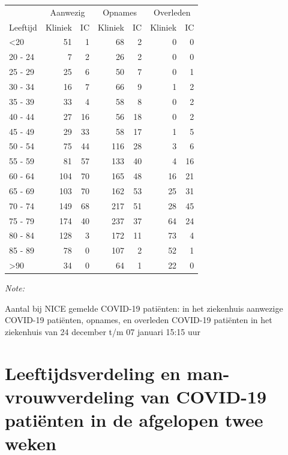 \documentclass[
  english,
  man,floatsintext]{apa6}
\begin{document}
\begin{table}
\centering\begingroup\fontsize{10}{12}\selectfont

\begin{threeparttable}
\begin{tabular}{lrrrrrr}
\toprule
\multicolumn{1}{c}{ } & \multicolumn{2}{c}{Aanwezig} & \multicolumn{2}{c}{Opnames} & \multicolumn{2}{c}{Overleden} \\
\cmidrule(l{3pt}r{3pt}){2-3} \cmidrule(l{3pt}r{3pt}){4-5} \cmidrule(l{3pt}r{3pt}){6-7}
Leeftijd & Kliniek & IC & Kliniek & IC & Kliniek & IC\\
\midrule
<20 & 51 & 1 & 68 & 2 & 0 & 0\\
20 - 24 & 7 & 2 & 26 & 2 & 0 & 0\\
25 - 29 & 25 & 6 & 50 & 7 & 0 & 1\\
30 - 34 & 16 & 7 & 66 & 9 & 1 & 2\\
35 - 39 & 33 & 4 & 58 & 8 & 0 & 2\\
40 - 44 & 27 & 16 & 56 & 18 & 0 & 2\\
45 - 49 & 29 & 33 & 58 & 17 & 1 & 5\\
50 - 54 & 75 & 44 & 116 & 28 & 3 & 6\\
55 - 59 & 81 & 57 & 133 & 40 & 4 & 16\\
60 - 64 & 104 & 70 & 165 & 48 & 16 & 21\\
65 - 69 & 103 & 70 & 162 & 53 & 25 & 31\\
70 - 74 & 149 & 68 & 217 & 51 & 28 & 45\\
75 - 79 & 174 & 40 & 237 & 37 & 64 & 24\\
80 - 84 & 128 & 3 & 172 & 11 & 73 & 4\\
85 - 89 & 78 & 0 & 107 & 2 & 52 & 1\\
>90 & 34 & 0 & 64 & 1 & 22 & 0\\
\bottomrule
\end{tabular}
\begin{tablenotes}
\item \textit{Note: } 
\item Aantal bij NICE gemelde COVID-19 patiënten: in het ziekenhuis aanwezige COVID-19 patiënten, opnames, en overleden COVID-19 patiënten in het ziekenhuis van 24 december t/m 07 januari 15:15 uur
\end{tablenotes}
\end{threeparttable}
\endgroup{}
\end{table}

\newpage

\hypertarget{leeftijdsverdeling-en-man-vrouwverdeling-van-covid-19-patiuxebnten-in-de-afgelopen-twee-weken}{%
\section{Leeftijdsverdeling en man-vrouwverdeling van COVID-19 patiënten in de afgelopen twee weken}\label{leeftijdsverdeling-en-man-vrouwverdeling-van-covid-19-patiuxebnten-in-de-afgelopen-twee-weken}}
\end{document}
